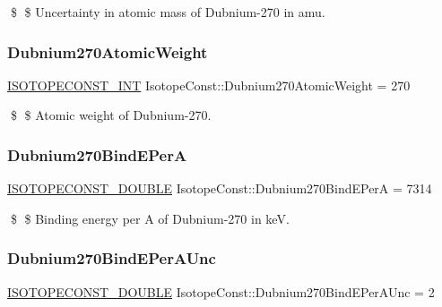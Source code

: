 \$ \$ Uncertainty in atomic mass of Dubnium-\/270 in amu. \mbox{\label{group___isotope_const-_dubnium-_db270_ga0ad1398e194fd7e8e1b0009911300159}} 
\subsubsection{\texorpdfstring{Dubnium270\+Atomic\+Weight}{Dubnium270AtomicWeight}}
{\footnotesize\ttfamily \mbox{\hyperlink{group___isotope_const-_macros_ga5f18360b3e99483a35c32d789e62621c}{I\+S\+O\+T\+O\+P\+E\+C\+O\+N\+S\+T\+\_\+\+I\+NT}} Isotope\+Const\+::\+Dubnium270\+Atomic\+Weight = 270}

\$ \$ Atomic weight of Dubnium-\/270. \mbox{\label{group___isotope_const-_dubnium-_db270_gab25fee7d3123474f6e6011dc07712f82}} 
\subsubsection{\texorpdfstring{Dubnium270\+Bind\+E\+PerA}{Dubnium270BindEPerA}}
{\footnotesize\ttfamily \mbox{\hyperlink{group___isotope_const-_macros_ga8f45a7272ce02c0b4c65c44636ed719a}{I\+S\+O\+T\+O\+P\+E\+C\+O\+N\+S\+T\+\_\+\+D\+O\+U\+B\+LE}} Isotope\+Const\+::\+Dubnium270\+Bind\+E\+PerA = 7314}

\$ \$ Binding energy per A of Dubnium-\/270 in keV. \mbox{\label{group___isotope_const-_dubnium-_db270_ga3e932c3f61f36362e51becc8753919e2}} 
\subsubsection{\texorpdfstring{Dubnium270\+Bind\+E\+Per\+A\+Unc}{Dubnium270BindEPerAUnc}}
{\footnotesize\ttfamily \mbox{\hyperlink{group___isotope_const-_macros_ga8f45a7272ce02c0b4c65c44636ed719a}{I\+S\+O\+T\+O\+P\+E\+C\+O\+N\+S\+T\+\_\+\+D\+O\+U\+B\+LE}} Isotope\+Const\+::\+Dubnium270\+Bind\+E\+Per\+A\+Unc = 2}

